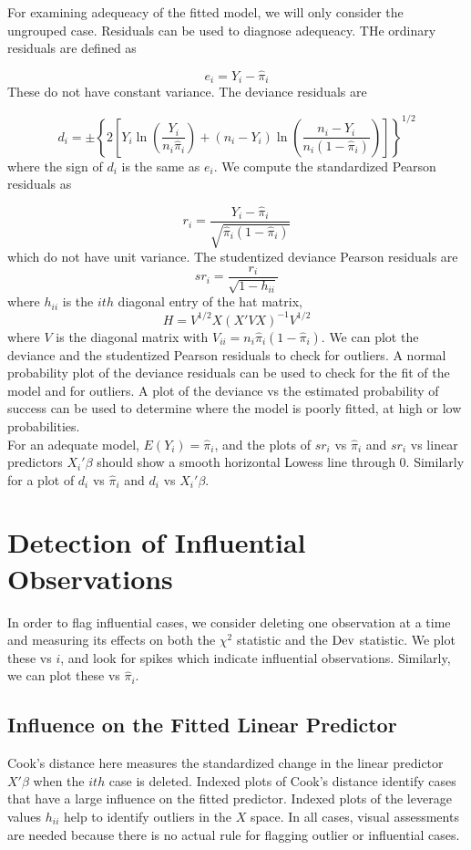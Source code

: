 For examining adequeacy of the fitted model, we will only consider the ungrouped case. Residuals can be used to diagnose adequeacy. THe ordinary residuals are defined as

\[e_i = Y_i - \hat{\pi}_i\]
These do not have constant variance. The deviance residuals are 

\[d_i = \pm \left\{2\left[Y_i \ln\left(\frac{Y_i}{n_i\hat{\pi}_i}\right) + (n_i-Y_i)\ln\left(\frac{n_i-Y_i}{n_i(1-\hat{\pi}_i)}\right)\right]\right\}^{1/2}\]
where the sign of $d_i$ is the same as $e_i$. We compute the standardized Pearson residuals as

\[r_i = \frac{Y_i - \hat{\pi}_i}{\sqrt{\hat{\pi}_i (1- \hat{\pi}_i)}}\]
which do not have unit variance. The studentized deviance Pearson residuals are
\[sr_i = \frac{r_i}{\sqrt{1-h_{ii}}}\]
where $h_{ii}$ is the $ith$ diagonal entry of the hat matrix, 
\[H = V^{1/2}X(X'VX)^{-1}V^{1/2}\]
where $V$ is the diagonal matrix with $V_{ii} = n_i\hat{\pi}_i(1-\hat{\pi}_i)$. We can plot the deviance and the studentized Pearson residuals to check for outliers. A normal probability plot of the deviance residuals can be used to check for the fit of the model and for outliers. A plot of the deviance vs the estimated probability of success can be used to determine where the model is poorly fitted, at high or low probabilities.\\

For an adequate model, $E(Y_i) = \hat{\pi}_i$, and the plots of $sr_i$ vs $\hat{\pi}_i$ and $sr_i$ vs linear predictors $X_i'\beta$ should show a smooth horizontal Lowess line through 0. Similarly for a plot of $d_i$ vs $\hat{\pi}_i$ and $d_i$ vs $X_i'\beta$.

\section{Detection of Influential Observations}

In order to flag influential cases, we consider deleting one observation at a time and measuring its effects on both the $\chi^2$ statistic and the $\operatorname{Dev}$ statistic. We plot these vs $i$, and look for spikes which indicate influential observations. Similarly, we can plot these vs $\hat{\pi}_i$.

\subsection{Influence on the Fitted Linear Predictor}

Cook's distance here measures the standardized change in the linear predictor $X'\beta$ when the $ith$ case is deleted. Indexed plots of Cook's distance identify cases that have a large influence on the fitted predictor. Indexed plots of the leverage values $h_{ii}$ help to identify outliers in the $X$ space. In all cases, visual assessments are needed because there is no actual rule for flagging outlier or influential cases.


